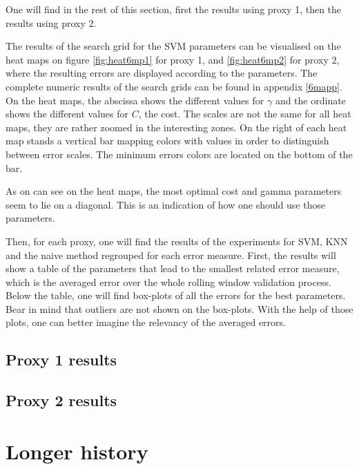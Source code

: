 \documentclass[11pt,a4paper,oneside]{book}
\begin{document}
One will find in the rest of this section, first the results using proxy 1, then the results using proxy 2.

The results of the search grid for the SVM parameters can be visualised on the heat maps on figure \ref{fig:heat6mp1} for proxy 1, and \ref{fig:heat6mp2} for proxy 2, where the resulting errors are displayed according to the parameters. The complete numeric results of the search grids can be found in appendix \ref{6mapp}. On the heat maps, the abscissa shows the different values for $\gamma$ and the ordinate shows the different values for $C$, the cost. The scales are not the same for all heat maps, they are rather zoomed in the interesting zones. On the right of each heat map stands a vertical bar mapping colors with values in order to distinguish between error scales. The minimum errors colors are located on the bottom of the bar.

As on can see on the heat maps, the most optimal cost and gamma parameters seem to lie on a diagonal. This is an indication of how one should use those parameters.

Then, for each proxy, one will find the results of the experiments for SVM, KNN and the naive method regrouped for each error measure. First, the results will show a table of the parameters that lead to the smallest related error measure, which is the averaged error over the whole rolling window validation process. Below the table, one will find box-plots of all the errors for the best parameters. Bear in mind that outliers are not shown on the box-plots. With the help of those plots, one can better imagine the relevancy of the averaged errors.



\clearpage
\subsection{Proxy 1 results}


\clearpage



\clearpage
\subsection{Proxy 2 results}


\clearpage




\clearpage
\section{Longer history}
\end{document}
